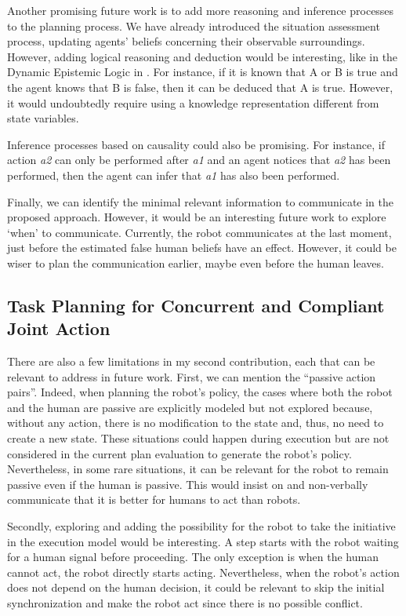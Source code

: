 Another promising future work is to add more reasoning and inference processes to the planning process. We have already introduced the situation assessment process, updating agents' beliefs concerning their observable surroundings. However, adding logical reasoning and deduction would be interesting, like in the Dynamic Epistemic Logic in \cite{bolander_gentle_2017}. For instance, if it is known that A or B is true and the agent knows that B is false, then it can be deduced that A is true.
However, it would undoubtedly require using a knowledge representation different from state variables.

Inference processes based on causality could also be promising. For instance, if action \textit{a2} can only be performed after \textit{a1} and an agent notices that \textit{a2} has been performed, then the agent can infer that \textit{a1} has also been performed. 

Finally, we can identify the minimal relevant information to communicate in the proposed approach. However, it would be an interesting future work to explore `when' to communicate. Currently, the robot communicates at the last moment, just before the estimated false human beliefs have an effect. However, it could be wiser to plan the communication earlier, maybe even before the human leaves.   

\subsection*{Task Planning for Concurrent and Compliant Joint Action}

There are also a few limitations in my second contribution, each that can be relevant to address in future work.
First, we can mention the ``passive action pairs''. Indeed, when planning the robot's policy, the cases where both the robot and the human are passive are explicitly modeled but not explored because, without any action, there is no modification to the state and, thus, no need to create a new state. These situations could happen during execution but are not considered in the current plan evaluation to generate the robot's policy. Nevertheless, in some rare situations, it can be relevant for the robot to remain passive even if the human is passive. This would insist on and non-verbally communicate that it is better for humans to act than robots. 

Secondly, exploring and adding the possibility for the robot to take the initiative in the execution model would be interesting. A step starts with the robot waiting for a human signal before proceeding. The only exception is when the human cannot act, the robot directly starts acting. Nevertheless, when the robot's action does not depend on the human decision, it could be relevant to skip the initial synchronization and make the robot act since there is no possible conflict. 

